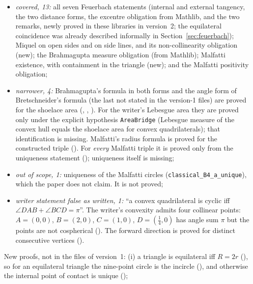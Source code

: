 \documentclass[11pt]{article}
\theoremstyle{definition}
\theoremstyle{remark}
\newcommand{\lean}[1]{\texttt{#1}}
\begin{document}
\begin{itemize}
\item \emph{covered, 13:} all seven Feuerbach statements (internal and external tangency, the two distance
forms, the excentre obligation from Mathlib, and the two remarks, newly proved in these libraries in version~2; the equilateral coincidence was
already described informally in Section~\ref{sec:feuerbach}); Miquel on open sides and on side
lines, and its non-collinearity obligation (new); the Brahmagupta measure obligation (from Mathlib);
Malfatti existence, with containment in the triangle (new); and the Malfatti positivity obligation;
\item \emph{narrower, 4:} Brahmagupta's formula in both forms and the angle form of Bretschneider's
formula (the last not stated in the version-1 files) are proved for the shoelace area (,
, ).
For the writer's Lebesgue area they are proved only under the explicit hypothesis \lean{AreaBridge}
(Lebesgue measure of the convex hull equals the shoelace area for convex quadrilaterals); that
identification is missing. Malfatti's radius formula is proved for the constructed triple
(). For \emph{every} Malfatti triple it is proved only from the
uniqueness statement (); uniqueness itself is missing;
\item \emph{out of scope, 1:} uniqueness of the Malfatti circles (\lean{classical\_B4\_a\_unique}), which
the paper does not claim. It is not proved;
\item \emph{writer statement false as written, 1:} ``a convex quadrilateral is cyclic iff
$\angle DAB+\angle BCD=\pi$''. The writer's convexity admits four collinear points: $A=(0,0)$, $B=(2,0)$,
$C=(1,0)$, $D=(\tfrac14,0)$ has angle sum $\pi$ but the points are not cospherical
(). The forward direction is proved for
distinct consecutive vertices ().
\end{itemize}
New proofs, not in the files of version~1:
(i) a triangle is equilateral iff $R=2r$ (), so for an
equilateral triangle the nine-point circle is the incircle
(), and otherwise the internal point of contact is
unique ();
\end{document}
